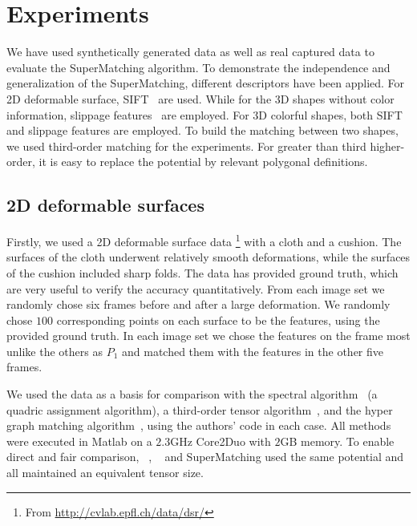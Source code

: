 \section{Experiments}
\label{sec:experiments}

We have used synthetically generated data as well as real captured data to evaluate the SuperMatching algorithm.
To demonstrate the independence and generalization of the SuperMatching, different descriptors have been applied.
For 2D deformable surface, SIFT~\cite{Lowe04} are used.
While for the 3D shapes without color information, slippage features~\cite{Bokeloh08} are employed.
For 3D colorful shapes, both SIFT and slippage features are employed.
To build the matching between two shapes, we used third-order matching for the experiments.
For greater than third higher-order, it is easy to replace the potential by relevant polygonal definitions.

\subsection{2D deformable surfaces}
\label{subsec:2DDeformable}

Firstly, we used a 2D deformable surface data \footnote{From \url{http://cvlab.epfl.ch/data/dsr/}} with a cloth and a cushion.
The surfaces of the cloth underwent relatively smooth deformations, while the surfaces of the cushion included sharp folds.
The data has provided ground truth, which are very useful to verify the accuracy quantitatively.
From each image set we randomly chose six frames before and after a large deformation.
We randomly chose $100$ corresponding points on each surface to be the features, using the provided ground truth.
In each image set we chose the features on the frame most unlike the others as $P_1$ and matched them with the features in the other five frames.

We used the data as a basis for comparison with the spectral algorithm~\cite{Cour06} (a quadric assignment algorithm),
a third-order tensor algorithm~\cite{Duchenne09},
and the hyper graph matching algorithm~\cite{Zass08}, using the authors' code in each case.
All methods were executed in Matlab on a $2.3$GHz Core2Duo with $2$GB memory.
To enable direct and fair comparison,
~\cite{Duchenne09}, ~\cite{Zass08} and SuperMatching used the same potential and all maintained an equivalent tensor size.

